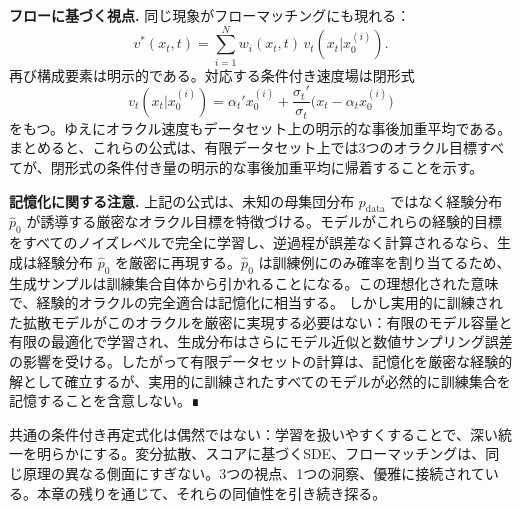 \begin{propositionbox}[例：有限データセット上の閉形式オラクル目標]
\textbf{フローに基づく視点.} 同じ現象がフローマッチングにも現れる：
\[
v^*(x_t, t) = \sum_{i=1}^N w_i(x_t, t)\, v_t(x_t|x_0^{(i)}).
\]
再び構成要素は明示的である。対応する条件付き速度場は閉形式
\[
v_t(x_t|x_0^{(i)}) = \alpha_t' x_0^{(i)} + \frac{\sigma_t'}{\sigma_t}\bigl(x_t - \alpha_t x_0^{(i)}\bigr)
\]
をもつ。ゆえにオラクル速度もデータセット上の明示的な事後加重平均である。
まとめると、これらの公式は、有限データセット上では3つのオラクル目標すべてが、閉形式の条件付き量の明示的な事後加重平均に帰着することを示す。

\textbf{記憶化に関する注意.} 上記の公式は、未知の母集団分布 $p_{\mathrm{data}}$ ではなく経験分布 $\hat{p}_0$ が誘導する厳密なオラクル目標を特徴づける。モデルがこれらの経験的目標をすべてのノイズレベルで完全に学習し、逆過程が誤差なく計算されるなら、生成は経験分布 $\hat{p}_0$ を厳密に再現する。$\hat{p}_0$ は訓練例にのみ確率を割り当てるため、生成サンプルは訓練集合自体から引かれることになる。この理想化された意味で、経験的オラクルの完全適合は記憶化に相当する。
しかし実用的に訓練された拡散モデルがこのオラクルを厳密に実現する必要はない：有限のモデル容量と有限の最適化で学習され、生成分布はさらにモデル近似と数値サンプリング誤差の影響を受ける。したがって有限データセットの計算は、記憶化を厳密な経験的解として確立するが、実用的に訓練されたすべてのモデルが必然的に訓練集合を記憶することを含意しない。∎
\end{propositionbox}


共通の条件付き再定式化は偶然ではない：学習を扱いやすくすることで、深い統一を明らかにする。変分拡散、スコアに基づくSDE、フローマッチングは、同じ原理の異なる側面にすぎない。3つの視点、1つの洞察、優雅に接続されている。本章の残りを通じて、それらの同値性を引き続き探る。

